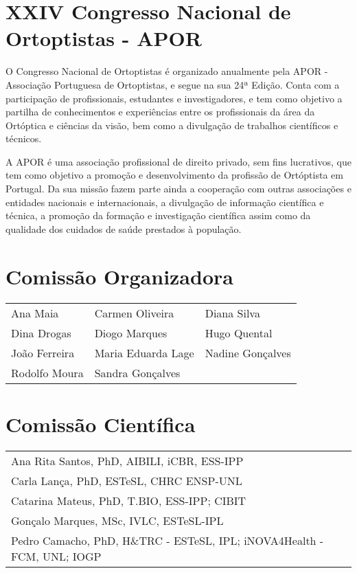 \section{XXIV Congresso Nacional de Ortoptistas - APOR}

O Congresso Nacional de Ortoptistas é organizado anualmente pela APOR - Associação Portuguesa de Ortoptistas, e segue na sua 24ª Edição. Conta com a participação de profissionais, estudantes e investigadores, e tem como objetivo a partilha de conhecimentos e experiências entre os profissionais da área da Ortóptica e ciências da visão, bem como a divulgação de trabalhos científicos e técnicos.

A APOR é uma associação profissional de direito privado, sem fins lucrativos, que tem como objetivo a promoção e desenvolvimento da profissão de Ortóptista em Portugal. Da sua missão fazem parte ainda a cooperação com outras associações e entidades nacionais e internacionais, a divulgação de informação científica e técnica, a promoção da formação e investigação científica assim como da qualidade dos cuidados de saúde prestados à população.

\section{Comissão Organizadora}
\begin{flushleft}
\begin{tabular}{lll}
Ana Maia & Carmen Oliveira &  Diana Silva \\
Dina Drogas & Diogo Marques &  Hugo Quental\\
João Ferreira & Maria Eduarda Lage & Nadine Gonçalves \\
Rodolfo Moura & Sandra Gonçalves 
\end{tabular}
\end{flushleft}

\section{Comissão Científica}
\begin{flushleft}
\begin{tabular}{l}
Ana Rita Santos, PhD, AIBILI, iCBR, ESS-IPP \\
Carla Lança, PhD, ESTeSL, CHRC ENSP-UNL \\
Catarina Mateus, PhD, T.BIO, ESS-IPP; CIBIT \\ 
Gonçalo Marques, MSc, IVLC, ESTeSL-IPL \\
Pedro Camacho, PhD, H\&TRC - ESTeSL, IPL; iNOVA4Health - FCM, UNL; IOGP \\ 
\end{tabular}
\end{flushleft}